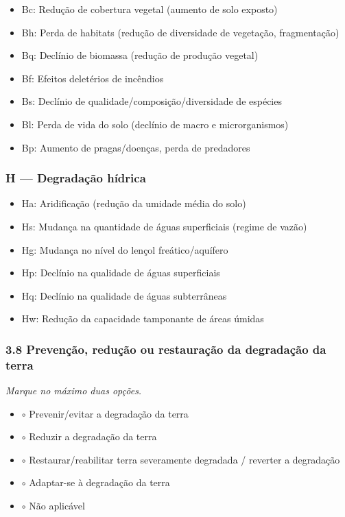 \begin{itemize}
\tightlist
\item[$\square$]
  Bc: Redução de cobertura vegetal (aumento de solo exposto)
\item[$\square$]
  Bh: Perda de habitats (redução de diversidade de vegetação, fragmentação)
\item[$\square$]
  Bq: Declínio de biomassa (redução de produção vegetal)
\item[$\square$]
  Bf: Efeitos deletérios de incêndios
\item[$\square$]
  Bs: Declínio de qualidade/composição/diversidade de espécies
\item[$\square$]
  Bl: Perda de vida do solo (declínio de macro e microrganismos)
\item[$\square$]
  Bp: Aumento de pragas/doenças, perda de predadores
\end{itemize}

\subsubsection{H --- Degradação hídrica}\label{h-degradauxe7uxe3o-huxeddrica}

\begin{itemize}
\tightlist
\item[$\square$]
  Ha: Aridificação (redução da umidade média do solo)
\item[$\square$]
  Hs: Mudança na quantidade de águas superficiais (regime de vazão)
\item[$\square$]
  Hg: Mudança no nível do lençol freático/aquífero
\item[$\square$]
  Hp: Declínio na qualidade de águas superficiais
\item[$\square$]
  Hq: Declínio na qualidade de águas subterrâneas
\item[$\square$]
  Hw: Redução da capacidade tamponante de áreas úmidas
\end{itemize}

\subsubsection{3.8 Prevenção, redução ou restauração da degradação da terra}\label{prevenuxe7uxe3o-reduuxe7uxe3o-ou-restaurauxe7uxe3o-da-degradauxe7uxe3o-da-terra}

\emph{Marque no máximo duas opções.}

\begin{itemize}
\tightlist
\item
  $\circ$ Prevenir/evitar a degradação da terra
\item
  $\circ$ Reduzir a degradação da terra
\item
  $\circ$ Restaurar/reabilitar terra severamente degradada / reverter a degradação
\item
  $\circ$ Adaptar-se à degradação da terra
\item
  $\circ$ Não aplicável
\end{itemize}

